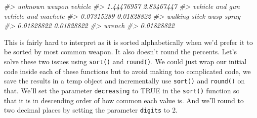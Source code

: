 \documentclass[
  12pt,
]{book}
\newenvironment{Shaded}{\begin{snugshade}}{\end{snugshade}}
\newcommand{\CommentTok}[1]{\textcolor[rgb]{0.56,0.35,0.01}{\textit{#1}}}
\begin{document}
\begin{Shaded}
\begin{Highlighting}[]
\CommentTok{\#>                   unknown weapon                          vehicle }
\CommentTok{\#>                       1.44476957                       2.83467447 }
\CommentTok{\#>                  vehicle and gun              vehicle and machete }
\CommentTok{\#>                       0.07315289                       0.01828822 }
\CommentTok{\#>                    walking stick                       wasp spray }
\CommentTok{\#>                       0.01828822                       0.01828822 }
\CommentTok{\#>                           wrench }
\CommentTok{\#>                       0.01828822}
\end{Highlighting}
\end{Shaded}

This is fairly hard to interpret as it is sorted alphabetically when we'd prefer it to be sorted by most common weapon. It also doesn't round the percents. Let's solve these two issues using \texttt{sort()} and \texttt{round()}. We could just wrap our initial code inside each of these functions but to avoid making too complicated code, we save the results in a temp object and incrementally use \texttt{sort()} and \texttt{round()} on that. We'll set the parameter \texttt{decreasing} to TRUE in the \texttt{sort()} function so that it is in descending order of how common each value is. And we'll round to two decimal places by setting the parameter \texttt{digits} to 2.
\end{document}
